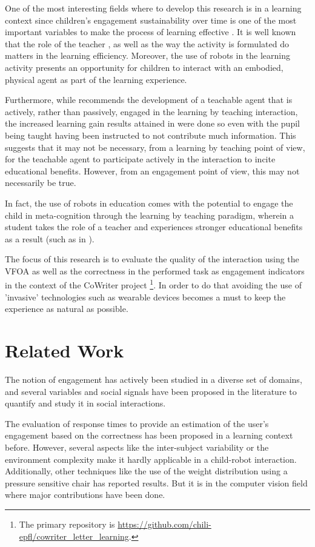 \documentclass{sig-alternate}
\begin{document}
One of the most interesting fields where to develop this research is in a learning context since children's engagement sustainability over time is one of the most important variables to make
the process of learning effective \cite{Umbach}. It is well known that the role of the teacher \cite{smith2005pedagogies}, as well as the way the activity is formulated do matters in the learning efficiency. Moreover, the use of robots in the learning activity presents an opportunity for children
to interact with an embodied, physical agent as part of the learning experience. 

Furthermore, while \cite{zhao2012learning} recommends the development of a teachable agent that is actively, rather than passively, engaged in the learning by teaching interaction, the increased learning gain results attained in \cite{okita2006observation} were done so even with the pupil being taught having been instructed to not contribute much information. This suggests that it may not be necessary, from a learning by teaching point of view, for the teachable agent to participate actively in the interaction to incite educational benefits. However, from an engagement point of view, this may not necessarily be true.

In fact, the use of robots in education comes with the potential to engage the child in meta-cognition through the learning by teaching paradigm, wherein a student takes the role of a teacher and experiences stronger educational benefits as a result (such as in \cite{Palinscar1984}).

The focus of this research is to evaluate the quality of the interaction using the VFOA as well as the correctness in the performed task as engagement indicators in the context of the CoWriter project \footnote{The primary repository is \url{https://github.com/chili-epfl/cowriter_letter_learning}.}. In order to do that avoiding the use of 'invasive' technologies such as wearable devices becomes a must to keep the experience as natural as possible.

\section{Related Work}

The notion of engagement has actively been studied in a diverse set of domains, and several variables and social signals have been proposed in the literature to quantify and study it in social interactions.

The evaluation of response times to provide an estimation of the user's engagement based on the correctness has been proposed in a learning context \cite{Beck} before. However, several aspects like the inter-subject variability or the environment complexity make it hardly applicable in a child-robot interaction. Additionally, other techniques \cite{Chipman07postureas} like the use of the weight distribution using a pressure sensitive chair has reported results. But it is in the computer vision field where major contributions have been done. 
\end{document}
